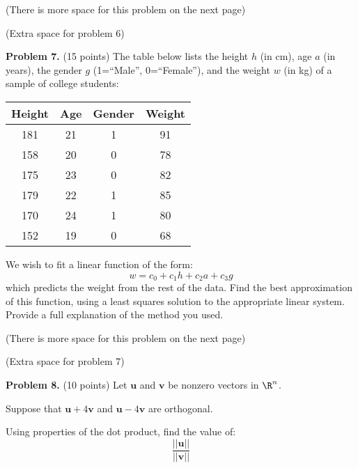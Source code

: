 \documentclass[12pt]{article}
\begin{document}
\vfill

(There is more space for this problem on the next page)

\clearpage

(Extra space for problem 6)

\clearpage

\textbf{Problem 7.} (15 points) The table below lists the height $h$ (in cm), age $a$ (in years), the gender $g$ (1=``Male'', 0=``Female''), and the weight $w$ (in kg) of a sample of college students:

\begin{center}
\begin{tabular}{c|c|c|c}
Height & Age & Gender & Weight\\\hline
181 & 21 & 1 & 91\\
158 & 20 & 0 & 78\\
175 & 23 & 0 & 82\\
179 & 22 & 1 & 85\\
170 & 24 & 1 & 80\\
152 & 19 & 0 & 68\\
\end{tabular}
\end{center}

We wish to fit a linear function of the form:
\[
w=c_0+c_1h+c_2a+c_3g
\]
which predicts the weight from the rest of the data. Find the best approximation of this function, using a least squares solution to the appropriate linear system. Provide a full explanation of the method you used.

\vfill

(There is more space for this problem on the next page)

\clearpage

(Extra space for problem 7)

\clearpage

\textbf{Problem 8.} (10 points) Let $\mathbf{u}$ and $\mathbf{v}$ be nonzero vectors in $\R^n$.

Suppose that $\mathbf{u}+4\mathbf{v}$ and $\mathbf{u}-4\mathbf{v}$ are orthogonal.

Using properties of the dot product, find the value of:
\[
\frac{||\mathbf{u}||}{||\mathbf{v}||}
\]
\end{document}
